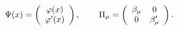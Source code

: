 \begin{equation}
\Psi (x)=\left(
\begin{array}{c}
\varphi (x) \\
\varphi ^{\prime }(x)
\end{array}
\right) ,\hspace{0.3in}\Pi _\mu =\left(
\begin{array}{cc}
\beta _\mu & 0 \\
0 & \beta _\mu ^{\prime }
\end{array}
\right) .  \label{38}
\end{equation}

